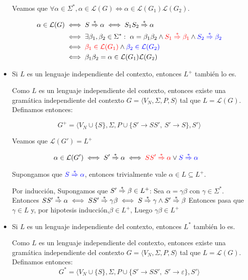 \begin{itemize}
\begin{demoPart}[0.8\textwidth]
          Veamos que \(\forall\alpha\in\Sigma^*, \alpha\in\mathcal{L}(G) \iff \alpha\in\mathcal{L}(G_1)\mathcal{L}(G_2)\).

          \begin{align*}
            \alpha\in\mathcal{L}(G) & \iff S\overset{*}{\Rightarrow}\alpha \iff S_1S_2\overset{*}{\Rightarrow}\alpha                                                                            \\
                                    & \iff\exists\beta_1,\beta_2\in\Sigma^*:~\alpha=\beta_1\beta_2\land {\color{red}S_1\overset{*}{\Rightarrow}\beta_1}\land {\color{blue}S_2\overset{*}{\Rightarrow}\beta_2} \\
                                    & \iff{\color{red}\beta_1\in\mathcal{L}(G_1)} \land {\color{blue}\beta_2\in\mathcal{L}(G_2)}                                            \\
                                    & \iff \beta_1\beta_2 = \alpha\in\mathcal{L}(G_1)\mathcal{L}(G_2)                                                         \\
          \end{align*}
        \end{demoPart}
  \item Si \(L\) es un lenguaje independiente del contexto, entonces \(L^+\) también lo es.
        \begin{demo}[0.8\textwidth]
          Como \(L\) es un lenguaje independiente del contexto, entonces existe una gramática independiente del contexto \(G=\langle V_N, \Sigma, P, S \rangle\) tal que \(L = \mathcal{L}(G)\). Definamos entonces:

          \[ G^+ = \langle V_N \cup \{S\}, \Sigma, P \cup \{ S' \to SS',~S'\to S\}, S'\rangle \]

          Veamos que \(\mathcal{L}(G') = L^+ \)

          \begin{align*}
            \alpha\in\mathcal{L}(G') & \iff S'\overset{*}{\Rightarrow}\alpha \iff {\color{red}SS' \overset{*}{\Rightarrow}\alpha}\lor{\color{blue}S\overset{*}{\Rightarrow}\alpha}
          \end{align*}

          Supongamos que \({\color{blue}S\overset{*}{\Rightarrow}\alpha}\), entonces trivialmente vale \(\alpha\in L\subseteq L^+\).

          Por inducción, Supongamos que \(S' \overset{*}{\Rightarrow}\beta\in L^+\): Sea \(\alpha =\gamma\beta\) con \(\gamma\in\Sigma^*\). Entonces \(SS'\overset{*}{\Rightarrow}\alpha \iff SS'\overset{*}{\Rightarrow}\gamma\beta \iff S\overset{*}{\Rightarrow}\gamma \land S'\overset{*}{\Rightarrow}\beta\)
          Entonces pasa que \(\gamma\in L\) y, por hipotesis inducción,\(\beta\in L^+\), Luego \(\gamma\beta\in L^+\)
        \end{demo}
  \item  Si \(L\) es un lenguaje independiente del contexto, entonces \(L^*\) también lo es.
        \begin{demo}[0.8\textwidth]
          Como \(L\) es un lenguaje independiente del contexto, entonces existe una gramática independiente del contexto \(G=\langle V_N, \Sigma, P, S \rangle\) tal que \(L = \mathcal{L}(G)\). Definamos entonces:
          \[
            G^* = \langle V_N \cup \{S\}, \Sigma, P \cup \{ S' \to SS',~S'\to \varepsilon\}, S'\rangle
          \]


\end{demo}
\end{itemize}
